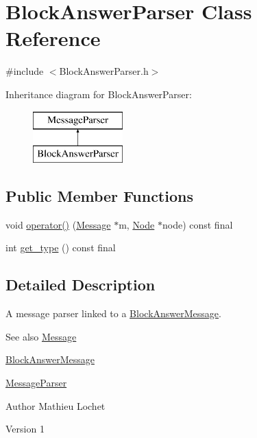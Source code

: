 \hypertarget{classBlockAnswerParser}{}\section{Block\+Answer\+Parser Class Reference}
\label{classBlockAnswerParser}


{\ttfamily \#include $<$Block\+Answer\+Parser.\+h$>$}

Inheritance diagram for Block\+Answer\+Parser\+:\begin{figure}[H]
\begin{center}
\leavevmode
\includegraphics[height=2.000000cm]{classBlockAnswerParser}
\end{center}
\end{figure}
\subsection*{Public Member Functions}
\begin{DoxyCompactItemize}
\item 
void \mbox{\hyperlink{classBlockAnswerParser_a984cd68ad8878777f86cf6ed0892dd1d}{operator()}} (\mbox{\hyperlink{classMessage}{Message}} $\ast$m, \mbox{\hyperlink{classNode}{Node}} $\ast$node) const final
\item 
int \mbox{\hyperlink{classBlockAnswerParser_af29553ca77e4879f40f60a871105b6d4}{get\+\_\+type}} () const final
\end{DoxyCompactItemize}


\subsection{Detailed Description}
A message parser linked to a \mbox{\hyperlink{classBlockAnswerMessage}{Block\+Answer\+Message}}. \begin{DoxySeeAlso}{See also}
\mbox{\hyperlink{classMessage}{Message}} 

\mbox{\hyperlink{classBlockAnswerMessage}{Block\+Answer\+Message}} 

\mbox{\hyperlink{classMessageParser}{Message\+Parser}}
\end{DoxySeeAlso}
\begin{DoxyAuthor}{Author}
Mathieu Lochet 
\end{DoxyAuthor}
\begin{DoxyVersion}{Version}
1 
\end{DoxyVersion}


